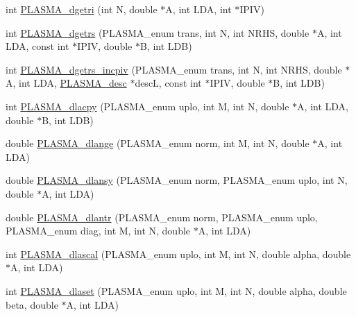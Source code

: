 \begin{DoxyCompactItemize}
int \hyperlink{group__double_gaef9247e762016885c0b31dc28356bab7_gaef9247e762016885c0b31dc28356bab7}{P\+L\+A\+S\+M\+A\+\_\+dgetri} (int N, double $\ast$A, int L\+D\+A, int $\ast$I\+P\+I\+V)
\item 
int \hyperlink{group__double_gaff3c22db4affbede58e22311320a2b85_gaff3c22db4affbede58e22311320a2b85}{P\+L\+A\+S\+M\+A\+\_\+dgetrs} (P\+L\+A\+S\+M\+A\+\_\+enum trans, int N, int N\+R\+H\+S, double $\ast$A, int L\+D\+A, const int $\ast$I\+P\+I\+V, double $\ast$B, int L\+D\+B)
\item 
int \hyperlink{group__double_ga39d27f0353921e5b63e0fdc9cca4b19c_ga39d27f0353921e5b63e0fdc9cca4b19c}{P\+L\+A\+S\+M\+A\+\_\+dgetrs\+\_\+incpiv} (P\+L\+A\+S\+M\+A\+\_\+enum trans, int N, int N\+R\+H\+S, double $\ast$A, int L\+D\+A, \hyperlink{structplasma__desc__t}{P\+L\+A\+S\+M\+A\+\_\+desc} $\ast$desc\+L, const int $\ast$I\+P\+I\+V, double $\ast$B, int L\+D\+B)
\item 
int \hyperlink{group__double_gaa1c69f5b82fa24bd925055b4e0595dab_gaa1c69f5b82fa24bd925055b4e0595dab}{P\+L\+A\+S\+M\+A\+\_\+dlacpy} (P\+L\+A\+S\+M\+A\+\_\+enum uplo, int M, int N, double $\ast$A, int L\+D\+A, double $\ast$B, int L\+D\+B)
\item 
double \hyperlink{group__double_ga51325eef4ca9e4ccd314358ec47535ec_ga51325eef4ca9e4ccd314358ec47535ec}{P\+L\+A\+S\+M\+A\+\_\+dlange} (P\+L\+A\+S\+M\+A\+\_\+enum norm, int M, int N, double $\ast$A, int L\+D\+A)
\item 
double \hyperlink{group__double_ga7d2422fb6092b7ad92fa0121d5c2d792_ga7d2422fb6092b7ad92fa0121d5c2d792}{P\+L\+A\+S\+M\+A\+\_\+dlansy} (P\+L\+A\+S\+M\+A\+\_\+enum norm, P\+L\+A\+S\+M\+A\+\_\+enum uplo, int N, double $\ast$A, int L\+D\+A)
\item 
double \hyperlink{group__double_gaaf76c1c67ebfa8c5c07b63d63c6b3522_gaaf76c1c67ebfa8c5c07b63d63c6b3522}{P\+L\+A\+S\+M\+A\+\_\+dlantr} (P\+L\+A\+S\+M\+A\+\_\+enum norm, P\+L\+A\+S\+M\+A\+\_\+enum uplo, P\+L\+A\+S\+M\+A\+\_\+enum diag, int M, int N, double $\ast$A, int L\+D\+A)
\item 
int \hyperlink{group__double_ga856971154c38103f1f9b57a3cab19734_ga856971154c38103f1f9b57a3cab19734}{P\+L\+A\+S\+M\+A\+\_\+dlascal} (P\+L\+A\+S\+M\+A\+\_\+enum uplo, int M, int N, double alpha, double $\ast$A, int L\+D\+A)
\item 
int \hyperlink{group__double_ga2b2e191b49f6e0fede1bcd352bcd14af_ga2b2e191b49f6e0fede1bcd352bcd14af}{P\+L\+A\+S\+M\+A\+\_\+dlaset} (P\+L\+A\+S\+M\+A\+\_\+enum uplo, int M, int N, double alpha, double beta, double $\ast$A, int L\+D\+A)

\end{DoxyCompactItemize}
